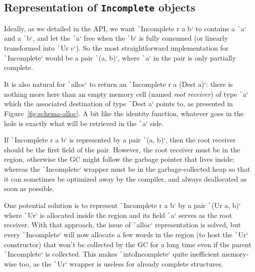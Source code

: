 \documentclass[english]{jflart}
\begin{document}
\subsection{Representation of \texttt{Incomplete} objects}

Ideally, as we detailed in the API, we want \texttt`Incomplete r a b` to contains a \texttt`a` and a \texttt`b`, and let the \texttt`a` free when the \texttt`b` is fully consumed (or linearly transformed into \texttt`Ur c`). So the most straightforward implementation for \texttt`Incomplete` would be a pair \texttt`(a, b)`, where \texttt`a` in the pair is only partially complete.

It is also natural for \texttt`alloc` to return an \texttt`Incomplete r a (Dest a)`: there is nothing more here than an empty memory cell (named \emph{root receiver}) of type \texttt`a` which the associated destination of type \texttt`Dest a` points to, as presented in Figure~\ref{fig:schema-alloc}. A bit like the identity function, whatever goes in the hole is exactly what will be retrieved in the \texttt`a` side.

If \texttt`Incomplete r a b` is represented by a pair \texttt`(a, b)`, then the root receiver should be the first field of the pair. However, the root receiver must be in the region, otherwise the GC might follow the garbage pointer that lives inside; whereas the \texttt`Incomplete` wrapper must be in the garbage-collected heap so that it can sometimes be optimized away by the compiler, and always deallocated as soon as possible.

One potential solution is to represent \texttt`Incomplete r a b` by a pair \texttt`(Ur a, b)` where \texttt`Ur` is allocated inside the region and its field \texttt`a` serves as the root receiver. With that approach, the issue of \texttt`alloc` representation is solved, but every \texttt`Incomplete` will now allocate a few words in the region (to host the \texttt`Ur` constructor) that won't be collected by the GC for a long time even if the parent \texttt`Incomplete` is collected. This makes \texttt`intoIncomplete` quite inefficient memory-wise too, as the \texttt`Ur` wrapper is useless for already complete structures.
\end{document}
